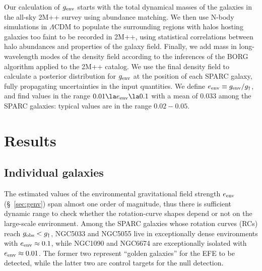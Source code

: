 \documentclass[twocolumn,tighten]{aastex63}
\begin{document}
Our calculation of $g_{\rm env}$ starts with the total dynamical masses of the galaxies in the all-sky 2M++ survey \citep{LH11} using abundance matching. We then use N-body simulations in $\Lambda$CDM to populate the surrounding regions with halos hosting galaxies too faint to be recorded in 2M++, using statistical correlations between halo abundances and properties of the galaxy field. Finally, we add mass in long-wavelength modes of the density field according to the inferences of the BORG algorithm \citep{LJ16} applied to the 2M++ catalog. We use the final density field to calculate a posterior distribution for $g_{\rm env}$ at the position of each SPARC galaxy, fully propagating uncertainties in the input quantities. We define $e_{\rm env} \equiv g_{\rm env}/g_\dagger$, and find values in the range $0.01 \la e_{\rm env} \la 0.1$ with a mean of $0.033$ among the SPARC galaxies: typical values are in the range $0.02-0.05$.

\section{Results} \label{sec:res}

\subsection{Individual galaxies} \label{sec:res_ind}

The estimated values of the environmental gravitational field strength $e_{\rm env}$ (\S~\ref{sec:genv}) span almost one order of magnitude, thus there is sufficient dynamic range to check whether the rotation-curve shapes depend or not on the large-scale environment. Among the SPARC galaxies whose rotation curves (RCs) reach $g_{\rm obs} < g_\dagger$, NGC5033 and NGC5055 live in exceptionally dense environments with $e_{\rm env} \approx 0.1$, while NGC1090 and NGC6674 are exceptionally isolated with $e_{\rm env}\approx 0.01$. The former two represent ``golden galaxies'' for the EFE to be detected, while the latter two are control targets for the null detection.
\end{document}
